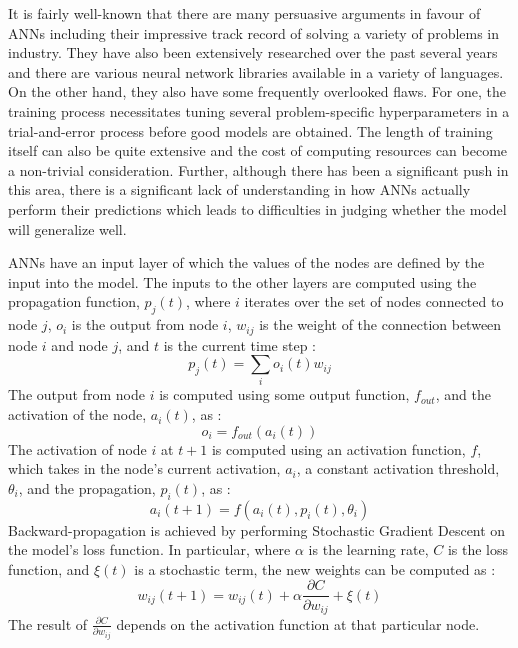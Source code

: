 It is fairly well-known that there are many persuasive arguments in favour of ANNs including their impressive track record of solving a variety of problems in industry. They have also been extensively researched over the past several years and there are various neural network libraries available in a variety of languages. On the other hand, they also have some frequently overlooked flaws. For one, the training process necessitates tuning several problem-specific hyperparameters in a trial-and-error process before good models are obtained. The length of training itself can also be quite extensive and the cost of computing resources can become a non-trivial consideration. Further, although there has been a significant push in this area, there is a significant lack of understanding in how ANNs actually perform their predictions which leads to difficulties in judging whether the model will generalize well.

ANNs have an input layer of which the values of the nodes are defined by the input into the model. The inputs to the other layers are computed using the propagation function, $p_j(t)$, where $i$ iterates over the set of nodes connected to node $j$, $o_i$ is the output from node $i$, $w_{ij}$ is the weight of the connection between node $i$ and node $j$, and $t$ is the current time step \cite{AnnMath}:
$$p_j(t) = \sum\limits_i o_i(t)w_{ij}$$
The output from node $i$ is computed using some output function, $f_{out}$, and the activation of the node, $a_i(t)$, as \cite{AnnMath}:
$$o_i = f_{out}(a_i(t))$$
The activation of node $i$ at $t+1$ is computed using an activation function, $f$, which takes in the node's current activation, $a_i$, a constant activation threshold, $\theta_i$, and the propagation, $p_i(t)$, as \cite{AnnMath}:
$$a_i(t+1) = f(a_i(t), p_i(t), \theta_i)$$
Backward-propagation is achieved by performing Stochastic Gradient Descent on the model's loss function. In particular, where $\alpha$ is the learning rate, $C$ is the loss function, and $\xi(t)$ is a stochastic term, the new weights can be computed as \cite{AnnMath}:
$$w_{ij}(t+1) = w_{ij}(t) + \alpha\frac{\partial C}{\partial w_{ij}} + \xi(t)$$
The result of $\frac{\partial C}{\partial w_{ij}}$ depends on the activation function at that particular node.